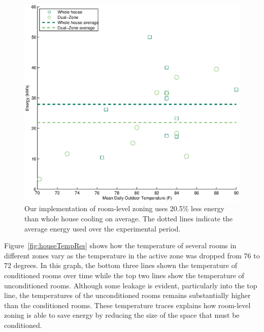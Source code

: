 \label{subsec:experimentalResults}
\begin{figure}[ht]
  \centering
  \includegraphics[width=1.0\columnwidth]{fig/meanEnergyScatter.eps}
  \caption[Energy Usage of Static Zones vs. Whole House Conditioning]{Our implementation of room-level zoning uses 20.5\% less energy than
    whole house cooling on average. The dotted lines indicate the average energy
    used over the experimental period.}
  \label{fig:energy}
\end{figure}

Figure~\ref{fig:houseTempRes} shows how the temperature of several rooms in
different zones vary as the temperature in the active zone was dropped from 76
to 72 degrees.  In this graph, the bottom three lines shown the temperature of
conditioned rooms over time while the top two lines show the temperature of
unconditioned rooms.  Although some leakage is evident, particularly into the
top line, the temperatures of the unconditioned rooms remains substantially
higher than the conditioned rooms.  These temperature traces explains how
room-level zoning is able to save energy by reducing the size of the space that
must be conditioned.

